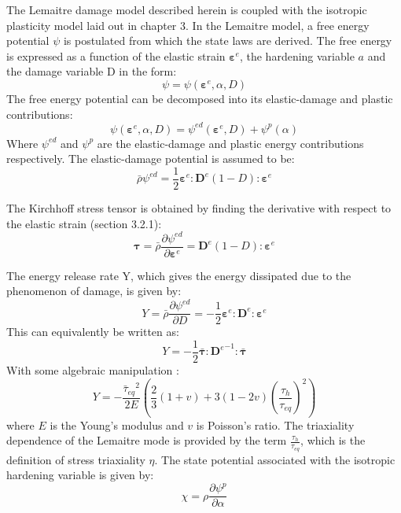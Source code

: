 \documentclass[sn-mathphys,Numbered,draft]{sn-jnl}%
\begin{document}
The Lemaitre damage model described herein is coupled with the isotropic plasticity model laid out in chapter 3. In the Lemaitre model, a free energy potential $\psi$ is postulated from which the state laws are derived. The free energy is expressed as a function of the elastic strain $\boldsymbol{\varepsilon}^e$, the hardening variable $a$ and the damage variable D in the form:
 \begin{equation}
	\psi=\psi\left(\boldsymbol{\varepsilon}^e,\alpha,D\right)
\end{equation}
The free energy potential can be decomposed into its elastic-damage and plastic contributions:
 \begin{equation}
	\psi\left(\boldsymbol{\varepsilon}^e,\alpha,D\right)=\psi^{ed}\left(\boldsymbol{\varepsilon}^e,D\right)+\psi^p\left(\alpha\right)
\end{equation}
Where $\psi^{ed}$ and $\psi^p$ are the elastic-damage and plastic energy contributions respectively. The elastic-damage potential is assumed to be:
 \begin{equation}
	\bar{\rho}\psi^{ed}=\frac{1}{2}\boldsymbol{\varepsilon}^e:\mathbf{D}^{e}\left(1-D\right):\boldsymbol{\varepsilon}^e	
\end{equation}

The Kirchhoff stress tensor is obtained by finding the derivative with respect to the elastic strain (section 3.2.1):
 \begin{equation}
	\boldsymbol{\tau}=\bar{\rho}\frac{\partial\psi^{ed}}{\partial\boldsymbol{\varepsilon}^e}=\mathbf{D}^{e}\left(1-D\right):\boldsymbol{\varepsilon}^e	
	\end{equation}

The energy release rate Y, which gives the energy dissipated due to the phenomenon of damage, is given by:
 \begin{equation}
	Y=\bar{\rho}\frac{\partial\psi^{ed}}{\partial D}=-\frac{1}{2}\boldsymbol{\varepsilon}^e:\mathbf{D}^e:\boldsymbol{\varepsilon}^e
\end{equation}
This can equivalently be written as:
 \begin{equation}
	Y=-\frac{1}{2}\bar{\boldsymbol{\tau}}:{\mathbf{D}^e}^{-1}:\bar{\boldsymbol{\tau}}
\end{equation}
With some algebraic manipulation \cite{lemaitre_engineering_2005}:
 \begin{equation}
 \label{eqn:classicY}
	Y=-\frac{{\bar{\tau}_{eq}}^2}{2E}\left(\frac{2}{3}\left(1+v\right)+3\left(1-2v\right)\left(\frac{\tau_h}{\tau_{eq}}\right)^2\right)	
\end{equation}
where $E$ is the Young's modulus and $v$ is Poisson's ratio. The triaxiality dependence of the Lemaitre mode is provided by the term $\frac{\tau_h}{\tau_{eq}}$, which is the definition of stress triaxiality $\eta$. The state potential associated with the isotropic hardening variable is given by: 
 \begin{equation}
	\chi=\rho\frac{\partial\psi^p}{\partial \alpha}
	\end{equation}
\end{document}
